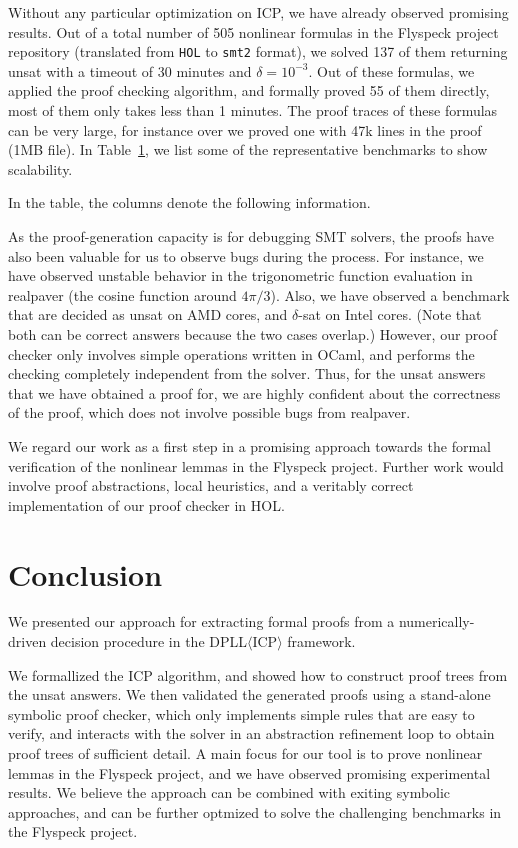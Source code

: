 \documentclass[envcountsect]{llncs}
\begin{document}
Without any particular optimization on ICP, we have already observed promising
results. Out of a total number of 505 nonlinear formulas in the Flyspeck project
repository (translated from {\tt HOL} to {\tt smt2} format), we solved
137 of them returning {\sf unsat} with a timeout of 30 minutes and
$\delta=10^{-3}$. Out of these formulas, we applied the proof checking
algorithm, and formally proved 55 of them directly, most of them only takes less
than 1 minutes. The proof traces of these formulas can be very large, for
instance over we proved one with 47k lines in the proof (1MB file). In
Table~\ref{}, we list some of the representative benchmarks to show
scalability. 

In the table, the columns denote the following information. 


As the proof-generation capacity is for debugging SMT solvers, the proofs have
also been valuable for us to observe bugs during the process. For instance, we
have observed unstable behavior in the trigonometric function evaluation in {\sf
realpaver} (the cosine function around $4\pi/3$). Also, we have observed a
benchmark that are decided as {\sf unsat} on AMD cores, and {\sf $\delta$-sat}
on Intel cores. (Note that both can be correct answers because the two cases
overlap.) However, our proof checker only involves simple operations written in
{\sf OCaml}, and performs the checking completely independent from the solver.
Thus, for the {\sf unsat} answers that we have obtained a proof for, we are
highly confident about the correctness of the proof, which does not involve
possible bugs from {\sf realpaver}. 

We regard our work as a first step in a promising approach towards the formal
verification of the nonlinear lemmas in the Flyspeck project. Further work
would involve proof abstractions, local heuristics, and a veritably correct
implementation of our proof checker in HOL. 


\section{Conclusion}

We presented our approach for extracting formal proofs from a numerically-driven
decision procedure in the DPLL$\langle$ICP$\rangle$ framework. 

We formallized the ICP algorithm, and showed how to construct proof trees from
the unsat answers. We then validated the generated proofs using a stand-alone symbolic proof
checker, which only implements simple rules that are easy to verify,
and interacts with the solver in an abstraction refinement loop to obtain
proof trees of sufficient detail. A main focus for our tool is to prove
nonlinear lemmas in the Flyspeck project, and we have observed promising
experimental results. We believe the approach can be combined with exiting
symbolic approaches, and can be further optmized to solve the challenging
benchmarks in the Flyspeck project. 





\end{document}
